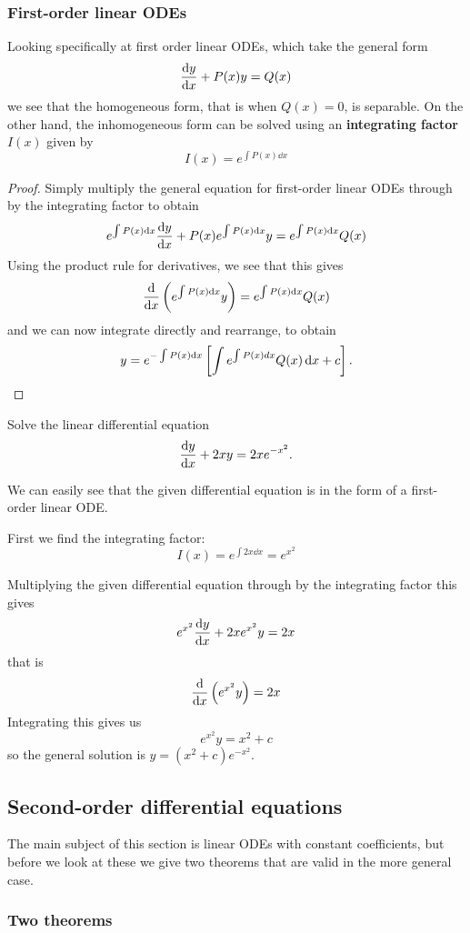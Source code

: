 \subsubsection{First-order linear ODEs}
Looking specifically at first order linear ODEs, which take the general form
\[ \dv{y}{x} + P(x)y = Q(x) \]
we see that the homogeneous form, that is when $Q(x) = 0$, is separable. On the other hand, the inhomogeneous form can be solved using an \textbf{integrating factor} $I(x)$ given by
\[ I(x) = e^{\int P(x) \dd{x}} \]
\begin{proof}
Simply multiply the general equation for first-order linear ODEs through by the integrating factor to obtain
\[ e^{\int P(x) \dd{x}} \dv{y}{x} + P(x) e^{\int P(x) \dd{x}}y = e^{\int P(x) \dd{x}} Q(x) \]
Using the product rule for derivatives, we see that this gives
\[ \dv{}{x}\left(e^{\int P(x) \dd{x}}y\right) = e^{\int P(x) \dd{x}} Q(x) \]
and we can now integrate directly and rearrange, to obtain
\[ y = e^{-\int P(x) \dd{x}} \left[\int e^{\int P(x)dx} Q(x) \dd{x} + c\right]. \]
\end{proof}

\begin{exmp}{}{}
Solve the linear differential equation 
\[ \dv{y}{x} + 2xy = 2xe^{-x^2}. \]
\end{exmp}
\begin{solution}
We can easily see that the given differential equation is in the form of a first-order linear ODE.

First we find the integrating factor:
\[ I(x) = e^{\int 2x \dd{x}} = e^{x^2} \]

Multiplying the given differential equation through by the integrating factor this gives
\[ e^{x^2} \dv{y}{x} + 2xe^{x^2}y = 2x \]
that is
\[ \dv{}{x}\left(e^{x^2}y\right)= 2x \]
Integrating this gives us
\[ e^{x^2}y = x^2 + c \]
so the general solution is $y = (x^2+c)e^{-x^2}$.
\end{solution}


\subsection{Second-order differential equations}
The main subject of this section is linear ODEs with constant coefficients, but before we look at these we give two theorems that are valid in the more general case.

\subsubsection{Two theorems}



